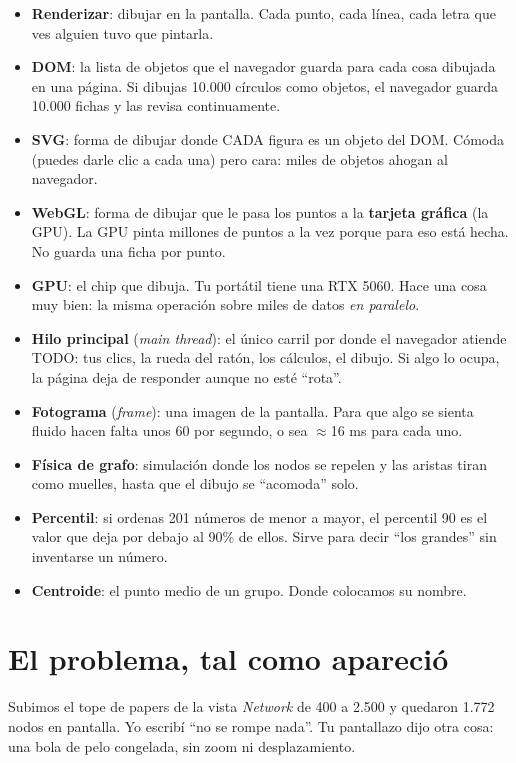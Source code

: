 \documentclass[11pt,a4paper]{article}
\begin{document}
\begin{itemize}
  \item \textbf{Renderizar}: dibujar en la pantalla. Cada punto, cada línea, cada letra
        que ves alguien tuvo que pintarla.
  \item \textbf{DOM}: la lista de objetos que el navegador guarda para cada cosa
        dibujada en una página. Si dibujas 10.000 círculos como objetos, el navegador
        guarda 10.000 fichas y las revisa continuamente.
  \item \textbf{SVG}: forma de dibujar donde CADA figura es un objeto del DOM. Cómoda
        (puedes darle clic a cada una) pero cara: miles de objetos ahogan al navegador.
  \item \textbf{WebGL}: forma de dibujar que le pasa los puntos a la \textbf{tarjeta
        gráfica} (la GPU). La GPU pinta millones de puntos a la vez porque para eso está
        hecha. No guarda una ficha por punto.
  \item \textbf{GPU}: el chip que dibuja. Tu portátil tiene una RTX 5060. Hace una cosa
        muy bien: la misma operación sobre miles de datos \emph{en paralelo}.
  \item \textbf{Hilo principal} (\emph{main thread}): el único carril por donde el
        navegador atiende TODO: tus clics, la rueda del ratón, los cálculos, el dibujo.
        Si algo lo ocupa, la página deja de responder aunque no esté ``rota''.
  \item \textbf{Fotograma} (\emph{frame}): una imagen de la pantalla. Para que algo se
        sienta fluido hacen falta unos 60 por segundo, o sea $\approx$16 ms para cada uno.
  \item \textbf{Física de grafo}: simulación donde los nodos se repelen y las aristas
        tiran como muelles, hasta que el dibujo se ``acomoda'' solo.
  \item \textbf{Percentil}: si ordenas 201 números de menor a mayor, el percentil 90 es
        el valor que deja por debajo al 90\% de ellos. Sirve para decir ``los grandes''
        sin inventarse un número.
  \item \textbf{Centroide}: el punto medio de un grupo. Donde colocamos su nombre.
\end{itemize}

\section{El problema, tal como apareció}

Subimos el tope de papers de la vista \emph{Network} de 400 a 2.500 y quedaron 1.772
nodos en pantalla. Yo escribí ``no se rompe nada''. Tu pantallazo dijo otra cosa: una
bola de pelo congelada, sin zoom ni desplazamiento.
\end{document}
